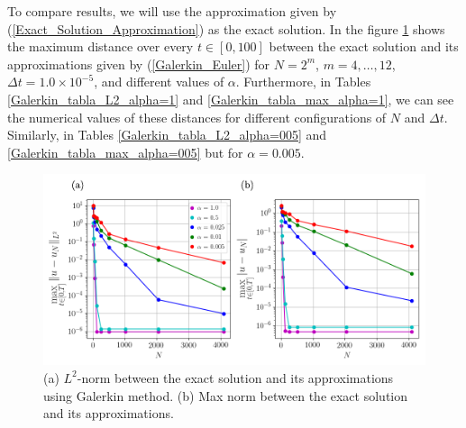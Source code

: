 		
		\newpage
		To compare results, we will use the approximation given by (\ref{Exact_Solution_Approximation}) as the exact solution. In the figure \ref{Galerkin_alphas} shows the maximum distance over every $t \in [0, 100]$ between the exact solution and its approximations given by (\ref{Galerkin_Euler}) for $N = 2^m$, $m = 4, \dots, 12$, $\Delta t = 1.0 \times 10^{-5}$, and different values of $\alpha$. Furthermore, in Tables \ref{Galerkin_tabla_L2_alpha=1} and \ref{Galerkin_tabla_max_alpha=1}, we can see the numerical values ​​of these distances for different configurations of $N$ and $\Delta t$. Similarly, in Tables \ref{Galerkin_tabla_L2_alpha=005} and \ref{Galerkin_tabla_max_alpha=005} but for $\alpha = 0.005$.
	
	\begin{figure}[H]
		\centering
		\includegraphics[width=15cm]{burgers_equation/deterministic/numerical_experiments/viscid/figures/galerkin/alphas_Error_N.png}
		\caption{(a) $L^2$-norm between the exact solution and its approximations using Galerkin method. (b) Max norm between the exact solution and its approximations.}
		\label{Galerkin_alphas}
	\end{figure}
	\newpage
